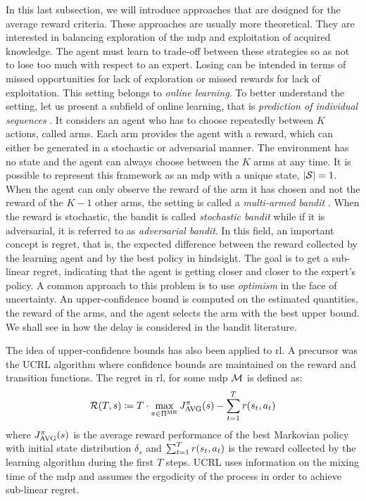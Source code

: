 In this last subsection, we will introduce approaches that are designed for the average reward criteria.
These approaches are usually more theoretical.
They are interested in balancing exploration of the \gls{mdp} and exploitation of acquired knowledge.
The agent must learn to trade-off between these strategies so as not to lose too much with respect to an expert.
Losing can be intended in terms of missed opportunities for lack of exploration or missed rewards for lack of exploitation.
This setting belongs to \emph{online learning}.
To better understand the setting, let us present a subfield of online learning, that is \emph{prediction of individual sequences} \cite{cesa2006prediction}.
It considers an agent who has to choose repeatedly between $K$ actions, called arms. 
Each arm provides the agent with a reward, which can either be generated in a stochastic or adversarial manner. 
The environment has no state and the agent can always choose between the $K$ arms at any time. 
It is possible to represent this framework as an \gls{mdp} with a unique state, \ie $\lvert \mathcal{S}\rvert=1$. 
When the agent can only observe the reward of the arm it has chosen and not the reward of the $K-1$ other arms, the setting is called a \emph{multi-armed bandit} \cite{lattimore2020bandit}. When the reward is stochastic, the bandit is called \emph{stochastic bandit} while if it is adversarial, it is referred to as \emph{adversarial bandit}.
In this field, an important concept is regret, that is, the expected difference between the reward collected by the learning agent and by the best policy in hindsight. 
The goal is to get a sub-linear regret, indicating that the agent is getting closer and closer to the expert's policy.
A common approach to this problem is to use \emph{optimism} in the face of uncertainty. 
An upper-confidence bound is computed on the estimated quantities, the reward of the arms, and the agent selects the arm with the best upper bound. We shall see in  how the delay is considered in the bandit literature.

The idea of upper-confidence bounds has also been applied to \gls{rl}. 
A precursor was the UCRL algorithm \cite{auer2006logarithmic} where confidence bounds are maintained on the reward and transition functions.
The regret in \gls{rl}, for some \gls{mdp} $\mathcal{M}$ is defined as:
\begin{align*}
    \mathcal{R}(T,s) \coloneq T\cdot\max_{\pi\in\Pi^{\text{MR}}} \averagereturnfunction(s) - \sum_{t=1}^T \expectedrewardfunction(s_t,a_t)
\end{align*}
where $\averagereturnfunction(s)$ is the average reward performance of the best Markovian policy with initial state distribution $\delta_s$ and $\textstyle \sum_{t=1}^T r(s_t,a_t)$ is the reward collected by the learning algorithm during the first $T$ steps.
UCRL uses information on the mixing time of the \gls{mdp} and assumes the ergodicity of the process in order to achieve sub-linear regret. 

